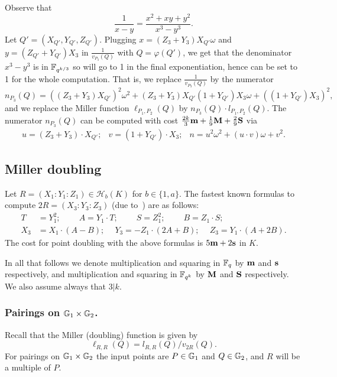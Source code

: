 Observe that
\[\frac{1}{x-y} = \frac{x^2 + xy + y^2}{x^3-y^3}.\]
Let $Q' = (X_{Q'},Y_{Q'},Z_{Q'})$.
Plugging $x = (Z_3 + Y_3)X_{Q'}\omega$ and $y = (Z_{Q'}+Y_{Q'})X_3$ in $\frac{1}{v_{P_3}(Q)}$ with $Q = \varphi(Q')$,
we get that the denominator $x^3 - y^3$ is in $\mathbb{F}_{q^{k/3}}$ so will go to 1 in the final exponentiation, hence can be set to 1 for the whole computation.
That is, we replace $\frac{1}{v_{P_3}(Q)}$ by the numerator 
$$n_{P_3}(Q) = ((Z_3 + Y_3)X_{Q'})^2\omega^2 
+ (Z_3 + Y_3)X_{Q'}(1+Y_{Q'})X_3\omega 
+ ((1+Y_{Q'})X_3)^2,$$
and we replace the Miller function 
$\ell_{P_1,P_2}(Q)$ by $n_{P_3}(Q) \cdot l_{P_1,P_2}(Q)$.
The numerator $n_{P_3}(Q)$ can be computed with cost
$\frac{2k}{3}\textbf{m} + \frac{1}{9}\textbf{M} + \frac{2}{9}\textbf{S}$ via
\[\begin{array}{cccc}
u = (Z_3 + Y_3)\cdot X_{Q'}; &
v = (1+Y_{Q'}) \cdot X_3; &
n = u^2\omega^2 + (u\cdot v)\omega + v^2.
\end{array}\]

\subsection{Miller doubling}

Let $R = (X_1 : Y_1 : Z_1) \in \mathcal{H}_b(K)$ for $b \in \{1,a\}$.
The fastest known formulas to compute $2R = (X_3 : Y_3 : Z_3)$
(due to~\cite{2015/hessian}) are as follows:
\begin{align*}
T &= Y_1^2;\	\qquad	A = Y_1 \cdot T;\	\qquad
S = Z_1 ^ 2;\	\qquad	B = Z_1 \cdot S;\\
X_3 &= X_1 \cdot (A - B);\	\quad
Y_3 = -Z_1 \cdot (2A + B);\	\quad
Z_3 = Y_1 \cdot (A + 2B).
\end{align*}
The cost for point doubling with the above formulas is
$5\textbf{m} + 2\textbf{s}$ in $K$.

In all that follows we denote multiplication and squaring in $\mathbb{F}_{q}$ by $\textbf{m}$ and $\textbf{s}$ respectively, and multiplication and squaring in $\mathbb{F}_{q^k}$ by $\textbf{M}$ and $\textbf{S}$ respectively. We also assume always that $3|k$.

\subsubsection{Pairings on $\mathbb{G}_{1} \times \mathbb{G}_{2}$.}

Recall that the Miller (doubling) function is given by
$$\ell_{R,R}(Q) = l_{R,R}(Q)/v_{2R}(Q).$$
For pairings on $\mathbb{G}_{1} \times \mathbb{G}_{2}$ the input points are
$P \in \mathbb{G}_{1}$ and $Q \in \mathbb{G}_{2}$, and
$R$ will be a multiple of $P$.


